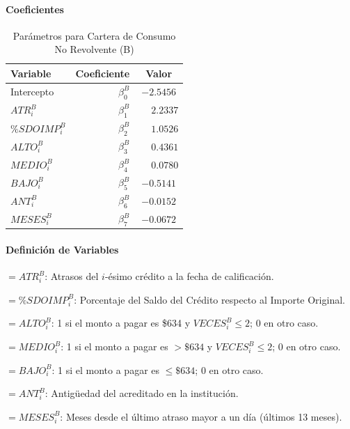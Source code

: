 \paragraph*{Coeficientes}

\begin{table}[h!]
\centering
\small
\begin{tabular}{lrc}
    \toprule
    \textbf{Variable} & \textbf{Coeficiente} & \textbf{Valor} \\
    \midrule
    Intercepto & $\beta_0^B$ & $-2.5456$ \\
    $ATR_i^B$ & $\beta_1^B$ & $\phantom{-}2.2337$ \\
    $\%SDOIMP_i^B$ & $\beta_2^B$ & $\phantom{-}1.0526$ \\
    $ALTO_i^B$ & $\beta_3^B$ & $\phantom{-}0.4361$ \\
    $MEDIO_i^B$ & $\beta_4^B$ & $\phantom{-}0.0780$ \\
    $BAJO_i^B$ & $\beta_5^B$ & $-0.5141$ \\
    $ANT_i^B$ & $\beta_6^B$ & $-0.0152$ \\
    $MESES_i^B$ & $\beta_7^B$ & $-0.0672$ \\
    \bottomrule
\end{tabular}
\caption{Parámetros para Cartera de Consumo No Revolvente (B)}
\end{table}

\paragraph*{Definición de Variables}

\begin{description}[leftmargin=2.5cm, labelwidth=2.3cm]
    \item[$Var_{i1}^B$] $= ATR_i^B$: Atrasos del $i$-ésimo crédito a la fecha de calificación.
    \item[$Var_{i2}^B$] $= \%SDOIMP_i^B$: Porcentaje del Saldo del Crédito respecto al Importe Original.
    \item[$Var_{i3}^B$] $= ALTO_i^B$: 1 si el monto a pagar es \$634 y $VECES_i^B \leq 2$; 0 en otro caso.
    \item[$Var_{i4}^B$] $= MEDIO_i^B$: 1 si el monto a pagar es $> \$634$ y $VECES_i^B \leq 2$; 0 en otro caso.
    \item[$Var_{i5}^B$] $= BAJO_i^B$: 1 si el monto a pagar es $\leq \$634$; 0 en otro caso.
    \item[$Var_{i6}^B$] $= ANT_i^B$: Antigüedad del acreditado en la institución.
    \item[$Var_{i7}^B$] $= MESES_i^B$: Meses desde el último atraso mayor a un día (últimos 13 meses).
\end{description}

